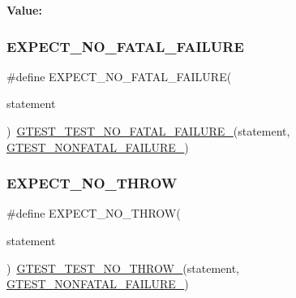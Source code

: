 {\bfseries Value\+:}
\begin{DoxyCode}{0}

\end{DoxyCode}
\mbox{\label{googletest-master_2googletest_2include_2gtest_2gtest_8h_a067c02ccaf3171d6e1781cd0f8cdcf74}} 
\subsubsection{\texorpdfstring{EXPECT\_NO\_FATAL\_FAILURE}{EXPECT\_NO\_FATAL\_FAILURE}}
{\footnotesize\ttfamily \#define E\+X\+P\+E\+C\+T\+\_\+\+N\+O\+\_\+\+F\+A\+T\+A\+L\+\_\+\+F\+A\+I\+L\+U\+RE(\begin{DoxyParamCaption}\item[{}]{statement }\end{DoxyParamCaption})~\mbox{\hyperlink{_obj__test_2lib_2googletest-release-1_88_81_2googletest_2include_2gtest_2internal_2gtest-internal_8h_a1b37a3c446836d33040f3266a6236081}{G\+T\+E\+S\+T\+\_\+\+T\+E\+S\+T\+\_\+\+N\+O\+\_\+\+F\+A\+T\+A\+L\+\_\+\+F\+A\+I\+L\+U\+R\+E\+\_\+}}(statement, \mbox{\hyperlink{_obj__test_2lib_2googletest-release-1_88_81_2googletest_2include_2gtest_2internal_2gtest-internal_8h_a6cb7482cfa03661a91c698eb5895f642}{G\+T\+E\+S\+T\+\_\+\+N\+O\+N\+F\+A\+T\+A\+L\+\_\+\+F\+A\+I\+L\+U\+R\+E\+\_\+}})}

\mbox{\label{googletest-master_2googletest_2include_2gtest_2gtest_8h_a2743a1438137ad857aa3f9fec3ff67ec}} 
\subsubsection{\texorpdfstring{EXPECT\_NO\_THROW}{EXPECT\_NO\_THROW}}
{\footnotesize\ttfamily \#define E\+X\+P\+E\+C\+T\+\_\+\+N\+O\+\_\+\+T\+H\+R\+OW(\begin{DoxyParamCaption}\item[{}]{statement }\end{DoxyParamCaption})~\mbox{\hyperlink{_obj__test_2lib_2googletest-release-1_88_81_2googletest_2include_2gtest_2internal_2gtest-internal_8h_a9a109d026b5a904646437d7570e13581}{G\+T\+E\+S\+T\+\_\+\+T\+E\+S\+T\+\_\+\+N\+O\+\_\+\+T\+H\+R\+O\+W\+\_\+}}(statement, \mbox{\hyperlink{_obj__test_2lib_2googletest-release-1_88_81_2googletest_2include_2gtest_2internal_2gtest-internal_8h_a6cb7482cfa03661a91c698eb5895f642}{G\+T\+E\+S\+T\+\_\+\+N\+O\+N\+F\+A\+T\+A\+L\+\_\+\+F\+A\+I\+L\+U\+R\+E\+\_\+}})}

